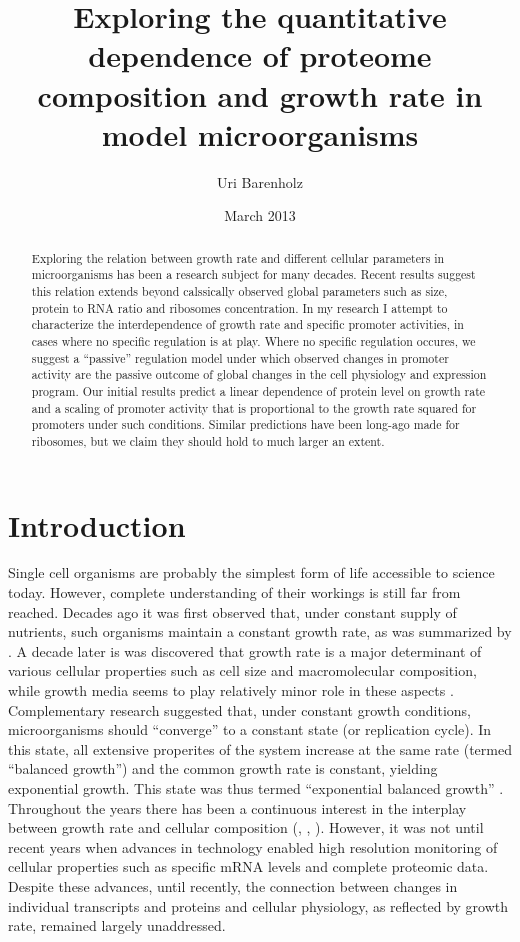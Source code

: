 \documentclass[a4page,notitlepage]{article}
\title{Exploring the quantitative dependence of proteome composition and growth rate in model microorganisms}
\author{Uri Barenholz}
\date{March 2013}
\begin{document}
\maketitle
\begin{abstract}
Exploring the relation between growth rate and different cellular parameters in microorganisms has been a research subject for many decades.
Recent results suggest this relation extends beyond calssically observed global parameters such as size, protein to RNA ratio and ribosomes concentration.
In my research I attempt to characterize the interdependence of growth rate and specific promoter activities, in cases where no specific regulation is at play.
Where no specific regulation occures, we suggest a ``passive'' regulation model under which observed changes in promoter activity are the passive outcome of global changes in the cell physiology and expression program.
Our initial results predict a linear dependence of protein level on growth rate and a scaling of promoter activity that is proportional to the growth rate squared for promoters under such conditions.
Similar predictions have been long-ago made for ribosomes, but we claim they should hold to much larger an extent.
\end{abstract}
\clearpage
\tableofcontents

\section{Introduction}
Single cell organisms are probably the simplest form of life accessible to science today.
However, complete understanding of their workings is still far from reached.
Decades ago it was first observed that, under constant supply of nutrients, such organisms maintain a constant growth rate, as was summarized by \parencite{Monod1949}.
A decade later is was discovered that growth rate is a major determinant of various cellular properties such as cell size and macromolecular composition, while growth media seems to play relatively minor role in these aspects \parencite{Schaechter1958}.
Complementary research suggested that, under constant growth conditions, microorganisms should ``converge'' to a constant state (or replication cycle).
In this state, all extensive properites of the system increase at the same rate (termed ``balanced growth'') and the common growth rate is constant, yielding exponential growth.
This state was thus termed ``exponential balanced growth'' \parencite{Campbell1957}.
Throughout the years there has been a continuous interest in the interplay between growth rate and cellular composition (\parencite{Maaloe1969}, \parencite{Pedersen1978a}, \parencite{Bremer1987}).
However, it was not until recent years when advances in technology enabled high resolution monitoring of cellular properties such as specific mRNA levels and complete proteomic data.
Despite these advances, until recently, the connection between changes in individual transcripts and proteins and cellular physiology, as reflected by growth rate, remained largely unaddressed.
\end{document}
